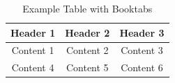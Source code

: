 \begin{table}[htbp]
	\centering
	\begin{tabular}{ccc}
		\toprule
		\textbf{Header 1} & \textbf{Header 2} & \textbf{Header 3} \\
		\midrule
		Content 1 & Content 2 & Content 3 \\
		Content 4 & Content 5 & Content 6 \\
		\bottomrule
	\end{tabular}
	\caption{Example Table with Booktabs}
	\label{tab:booktabs_example}
\end{table}